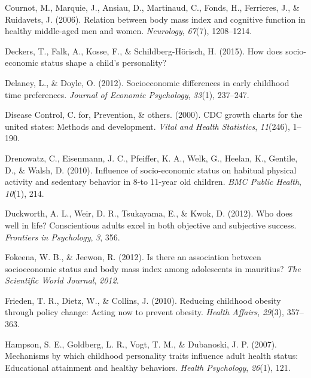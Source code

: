 \documentclass[man]{apa6}
\begin{document}
\leavevmode\hypertarget{ref-cournot2006relation}{}%
Cournot, M., Marquie, J., Ansiau, D., Martinaud, C., Fonds, H., Ferrieres, J., \& Ruidavets, J. (2006). Relation between body mass index and cognitive function in healthy middle-aged men and women. \emph{Neurology}, \emph{67}(7), 1208--1214.

\leavevmode\hypertarget{ref-deckers2015does}{}%
Deckers, T., Falk, A., Kosse, F., \& Schildberg-Hörisch, H. (2015). How does socio-economic status shape a child's personality?

\leavevmode\hypertarget{ref-delaney2012socioeconomic}{}%
Delaney, L., \& Doyle, O. (2012). Socioeconomic differences in early childhood time preferences. \emph{Journal of Economic Psychology}, \emph{33}(1), 237--247.

\leavevmode\hypertarget{ref-centers2000cdc}{}%
Disease Control, C. for, Prevention, \& others. (2000). CDC growth charts for the united states: Methods and development. \emph{Vital and Health Statistics}, \emph{11}(246), 1--190.

\leavevmode\hypertarget{ref-drenowatz2010influence}{}%
Drenowatz, C., Eisenmann, J. C., Pfeiffer, K. A., Welk, G., Heelan, K., Gentile, D., \& Walsh, D. (2010). Influence of socio-economic status on habitual physical activity and sedentary behavior in 8-to 11-year old children. \emph{BMC Public Health}, \emph{10}(1), 214.

\leavevmode\hypertarget{ref-duckworth2012does}{}%
Duckworth, A. L., Weir, D. R., Tsukayama, E., \& Kwok, D. (2012). Who does well in life? Conscientious adults excel in both objective and subjective success. \emph{Frontiers in Psychology}, \emph{3}, 356.

\leavevmode\hypertarget{ref-fokeena2012there}{}%
Fokeena, W. B., \& Jeewon, R. (2012). Is there an association between socioeconomic status and body mass index among adolescents in mauritius? \emph{The Scientific World Journal}, \emph{2012}.

\leavevmode\hypertarget{ref-frieden2010reducing}{}%
Frieden, T. R., Dietz, W., \& Collins, J. (2010). Reducing childhood obesity through policy change: Acting now to prevent obesity. \emph{Health Affairs}, \emph{29}(3), 357--363.

\leavevmode\hypertarget{ref-hampson2007mechanisms}{}%
Hampson, S. E., Goldberg, L. R., Vogt, T. M., \& Dubanoski, J. P. (2007). Mechanisms by which childhood personality traits influence adult health status: Educational attainment and healthy behaviors. \emph{Health Psychology}, \emph{26}(1), 121.
\end{document}

